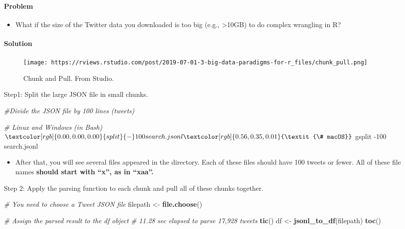 \documentclass[
]{book}
\newenvironment{Shaded}{\begin{snugshade}}{\end{snugshade}}
\newcommand{\CommentTok}[1]{\textcolor[rgb]{0.56,0.35,0.01}{\textit{#1}}}
\newcommand{\ExtensionTok}[1]{#1}
\newcommand{\FunctionTok}[1]{\textcolor[rgb]{0.00,0.00,0.00}{#1}}
\newcommand{\KeywordTok}[1]{\textcolor[rgb]{0.13,0.29,0.53}{\textbf{#1}}}
\newcommand{\NormalTok}[1]{#1}
\newcommand{\StringTok}[1]{\textcolor[rgb]{0.31,0.60,0.02}{#1}}
\providecommand{\tightlist}{%
  \setlength{\itemsep}{0pt}\setlength{\parskip}{0pt}}
\begin{document}
\hypertarget{problem-3}{%
\paragraph{Problem}\label{problem-3}}

\begin{itemize}
\tightlist
\item
  What if the size of the Twitter data you downloaded is too big (e.g., \textgreater10GB) to do complex wrangling in R?
\end{itemize}

\hypertarget{solution-2}{%
\paragraph{Solution}\label{solution-2}}

\begin{figure}
\centering
\texttt{[image: https://rviews.rstudio.com/post/2019-07-01-3-big-data-paradigms-for-r\_files/chunk\_pull.png]}
\caption{Chunk and Pull. From Studio.}
\end{figure}

Step1: Split the large JSON file in small chunks.

\begin{Shaded}
\begin{Highlighting}[]
\CommentTok{\#Divide the JSON file by 100 lines (tweets)}

\CommentTok{\# Linux and Windows (in Bash)}
\NormalTok{$ }\FunctionTok{split}\NormalTok{ {-}100 search.jsonl}

\CommentTok{\# macOS}
\NormalTok{$ }\ExtensionTok{gsplit}\NormalTok{ {-}100 search.jsonl}
\end{Highlighting}
\end{Shaded}

\begin{itemize}
\tightlist
\item
  After that, you will see several files appeared in the directory. Each of these files should have 100 tweets or fewer. All of these file names \textbf{should start with ``x'', as in ``xaa''.}
\end{itemize}

Step 2: Apply the parsing function to each chunk and pull all of these chunks together.

\begin{Shaded}
\begin{Highlighting}[]
\CommentTok{\# You need to choose a Tweet JSON file}
\NormalTok{filepath \textless{}{-}}\StringTok{ }\KeywordTok{file.choose}\NormalTok{()}

\CommentTok{\# Assign the parsed result to the \textasciigrave{}df\textasciigrave{} object}
\CommentTok{\# 11.28 sec elapsed to parse 17,928 tweets }
\KeywordTok{tic}\NormalTok{()}
\NormalTok{df \textless{}{-}}\StringTok{ }\KeywordTok{jsonl\_to\_df}\NormalTok{(filepath)}
\KeywordTok{toc}\NormalTok{()}
\end{Highlighting}
\end{Shaded}
\end{document}
